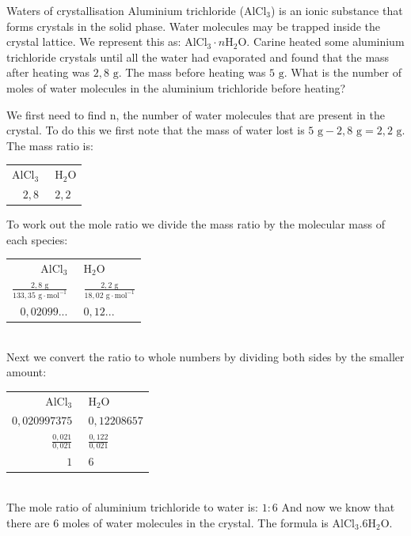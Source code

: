     \noindent
\par
            \label{m38712*eid672431}
      \noindent
      \begin{wex}{Waters of crystallisation}{
\label{m38712*pid47982}
\label{m38712*id64827}Aluminium trichloride (${\text{AlCl}}_{3}$) is an ionic substance that forms crystals in the solid phase. Water molecules may be trapped inside the crystal lattice. We represent this as: ${\text{AlCl}}_{3} \cdot n{\text{H}}_{2}\text{O}$. Carine heated some aluminium trichloride crystals until all the water had evaporated and found that the mass after heating was $2,8 \text{ g}$. The mass before heating was $5 \text{ g}$. What is the number of moles of water molecules in the aluminium trichloride before heating?
}
{
We first need to find n, the number of water molecules that are present in the crystal. To do this we first note that the mass of water lost is $5 \text{ g} - 2,8 \text{ g} = 2,2 \text{ g}$.
  \label{m38712*id3892}The mass ratio is:\\
\begin{tabular}{r@{:}l}
 $\text{AlCl}_3~$ & $~\text{H}_{2}\text{O}$ \\
   $2,8~$ & $~2,2$ \\
\end{tabular}
To work out the mole ratio we divide the mass ratio by the molecular mass of each species:\\
\begin{tabular}{r@{:}l}
 $\text{AlCl}_3~$ & $~\text{H}_{2}\text{O}$ \\
    $\frac{2,8 \text{ g}}{133,35 \text{ g} \cdot \text{mol}^{-1}}~$ & $~\frac{2,2 \text{ g}}{18,02 \text{ g} \cdot \text{mol}^{-1}}$ \\
$0,02099...~$ & $~0,12...$  \\
\end{tabular}\\
Next we convert the ratio to whole numbers by dividing both sides by the smaller amount:\\
\begin{tabular}{r@{:}l}
 $\text{AlCl}_3~$ & $~\text{H}_{2}\text{O}$ \\
$0,020997375~$ & $~0,12208657$ \\
$\frac{0,021}{0,021}~$ & $~\frac{0,122}{0,021}$ \\
$1~$ & $~6$ \\
\end{tabular}\\
The mole ratio of aluminium trichloride to water is: $1:6$
And now we know that there are $6$ moles of water molecules in the crystal. The formula is $\text{AlCl}_{3}.6\text{H}_{2}\text{O}$.
}
    \end{wex}

